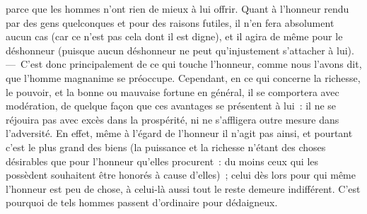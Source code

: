 \documentclass[french,twoside]{book} %
\begin{document}
parce que les hommes n’ont rien de mieux à lui offrir. Quant à l’honneur rendu par des gens quelconques et pour des raisons futiles, il n’en fera absolument aucun cas (car ce n’est pas cela dont il est digne), et il agira de même pour le déshonneur (puisque aucun déshonneur ne peut qu’injustement s’attacher à lui). — C’est donc principalement de ce qui touche l’honneur, comme nous l’avons dit, que l’homme magnanime se préoccupe. Cependant, en ce qui concerne la richesse, le pouvoir, et la bonne ou mauvaise fortune en général, il se comportera avec \\
modération, de quelque façon que ces avantages se présentent à lui : il ne se réjouira pas avec excès dans la prospérité, ni ne s’affligera outre mesure dans l’adversité. En effet, même à l’égard de l’honneur il n’agit pas ainsi, et pourtant c’est le plus grand des biens (la puissance et la richesse n’étant des choses désirables que pour l’honneur qu’elles procurent : du moins ceux qui les possèdent souhaitent être honorés à cause d’elles) ; celui dès lors pour qui même l’honneur est peu de chose, à celui-là aussi tout le reste demeure indifférent. C’est pourquoi de tels hommes passent d’ordinaire pour dédaigneux.
\end{document}
